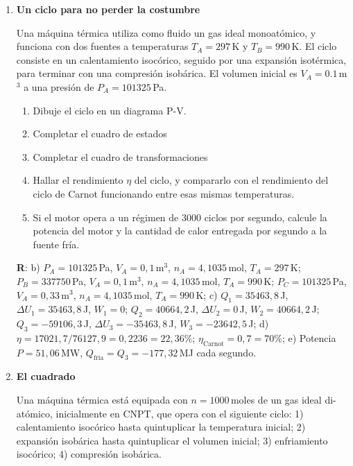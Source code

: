 \documentclass[a4paper,12pt]{article}
\begin{document}
\begin{enumerate}
	\item {\bf{Un ciclo para no perder la costumbre}}
		
		Una máquina térmica utiliza como fluido un gas ideal monoatómico, y
		funciona con dos fuentes a temperaturas $T_A = 297$\,K y $T_B =
		990$\,K. El ciclo consiste en un calentamiento isocórico, seguido por
		una expansión isotérmica, para terminar con una compresión isobárica.
		El volumen inicial es $V_A=0.1$\,m$^3$ a una presión de
		$P_A=101325$\,Pa.
		
		\begin{enumerate}
			\item Dibuje el ciclo en un diagrama P-V.
			\item Completar el cuadro de estados 
			\item Completar el cuadro de transformaciones
			\item Hallar el rendimiento $\eta$ del ciclo, y compararlo con el
				rendimiento del ciclo de Carnot funcionando entre esas mismas
				temperaturas.
			\item Si el motor opera a un régimen de $3000$ ciclos por segundo,
				calcule la potencia del motor y la cantidad de calor entregada
				por segundo a la fuente fría.
		\end{enumerate}
		{\bf{R}}: b) $P_A=101325$\,Pa, $V_A=0,1$\,m$^3$, $n_A=4,1035$\,mol,
		$T_A=297$\,K; $P_B=337750$\,Pa, $V_A=0,1$\,m$^3$, $n_A=4,1035$\,mol,
		$T_A=990$\,K; $P_C=101325$\,Pa, $V_A=0,33$\,m$^3$, $n_A=4,1035$\,mol,
		$T_A=990$\,K; c) $Q_1=35463,8$\,J, $\Delta U_1=35463,8$\,J, $W_1=0$;
		$Q_2=40664,2$\,J, $\Delta U_2=0$\,J, $W_2=40664,2$\,J;
		$Q_3=-59106,3$\,J, $\Delta U_3=-35463,8$\,J, $W_3=-23642,5$\,J; d)
		$\eta=17021,7/76127,9 = 0,2236 = 22,36\%$; $\eta_{\mathrm{Carnot}} =
		0,7 = 70\%$; e) Potencia $P=51,06$\,MW,
		$Q_{\mathrm{fria}}=Q_3=-177,32$\,MJ cada segundo.
	
	\item {\bf{El cuadrado}}
		
		Una máquina térmica está equipada con $n=1000$\,moles de un gas ideal
		di-atómico, inicialmente en CNPT, que opera con el siguiente ciclo: 1)
		calentamiento isocórico hasta quintuplicar la temperatura inicial; 2)
		expansión isobárica hasta quintuplicar el volumen inicial; 3)
		enfriamiento isocórico; 4) compresión isobárica.
		

\end{enumerate}
\end{document}
